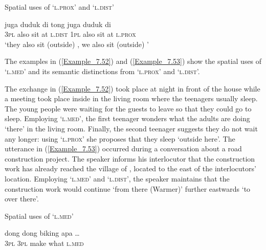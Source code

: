 {\begin{styleExampleTitle}
Spatial uses of  ‘\textsc{l.prox}’ and  ‘\textsc{l.dist}’
\end{styleExampleTitle}

\ea
\label{Example_7.51}
 {juga} {duduk} {di} {} {tong} {juga} {duduk} {di} {}\\ %
 \textsc{3pl}  also  sit  at  \textsc{l.dist}  \textsc{1pl}  also  sit  at  \textsc{l.prox}\\
\glt 
‘they also sit (outside) , we also sit (outside) ’ \textstyleExampleSource{[081025-009b-Cv.0075]}
\z



The examples in (\ref{Example_7.52}) and (\ref{Example_7.53}) show the spatial uses of  ‘\textsc{l.med}’ and its semantic distinctions from  ‘\textsc{l.prox}’ and  ‘\textsc{l.dist}’.



The exchange in (\ref{Example_7.52}) took place at night in front of the house while a meeting took place inside in the living room where the teenagers usually sleep. The young people were waiting for the guests to leave so that they could go to sleep. Employing  ‘\textsc{l.med}’, the first teenager wonders what the adults are doing  ‘there’ in the living room. Finally, the second teenager suggests they do not wait any longer: using  ‘\textsc{l.prox}’ she proposes that they sleep  ‘outside here’. The utterance in (\ref{Example_7.53}) occurred during a conversation about a road construction project. The speaker informs his interlocutor that the construction work has already reached the village of , located to the east of the interlocutors’ location. Employing  ‘\textsc{l.med}’ and  ‘\textsc{l.dist}’, the speaker maintains that the construction work would continue  ‘from there (Warmer)’ further eastwards  ‘to over there’.


\begin{styleExampleTitle}
Spatial uses of  ‘\textsc{l.med}’
\end{styleExampleTitle}

\ea
\label{Example_7.52}
\ea
\label{Example_7.52a}
 {dong} dong  biking  apa    \ldots\\ %
  { }     \textsc{3pl}  \textsc{3pl}  make  what  \textsc{l.med}  \\

}
